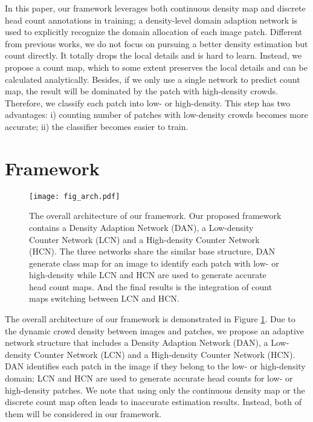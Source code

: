\documentclass[journal]{IEEEtran}
\begin{document}
In this paper, our framework leverages both continuous density map and discrete head count annotations in training; a density-level domain adaption network is used to explicitly recognize the domain allocation of each image patch. Different from previous works, we do not focus on pursuing a better density estimation but count directly. It totally drops the local details and is hard to learn. Instead, we propose a count map, which to some extent preserves the local details and can be calculated analytically. Besides, if we only use a single network to predict count map, the result will be dominated by the patch with high-density crowds. Therefore, we classify each patch into low- or high-density. This step has two advantages: i) counting number of patches with low-density crowds becomes more accurate; ii) the classifier becomes easier to train.

\section{Framework}
\label{sec:method}

\begin{figure}[t]
  \centering
  \texttt{[image: fig\_arch.pdf]}
  \caption{The overall architecture of our framework. Our proposed framework contains a Density Adaption Network (DAN), a Low-density Counter Network (LCN) and a High-density Counter Network (HCN). The three networks share the similar base structure, DAN generate class map for an image to identify each patch with low- or high-density while LCN and HCN are used to generate accurate head count maps. And the final results is the integration of count maps switching between LCN and HCN.}
  \label{fig:architecture}
  \vspace{-0.15in}
\end{figure}

The overall architecture of our framework is demonstrated in Figure \ref{fig:architecture}. Due to the dynamic crowd density between images and patches, we propose an adaptive network structure that includes a Density Adaption Network (DAN), a Low-density Counter Network (LCN) and a High-density Counter Network (HCN). DAN identifies each patch in the image if they belong to the low- or high-density domain; LCN and HCN are used to generate accurate head counts for low- or high-density patches. We note that using only the continuous density map or the discrete count map often leads to inaccurate estimation results. Instead, both of them will be considered in our framework.
\end{document}
